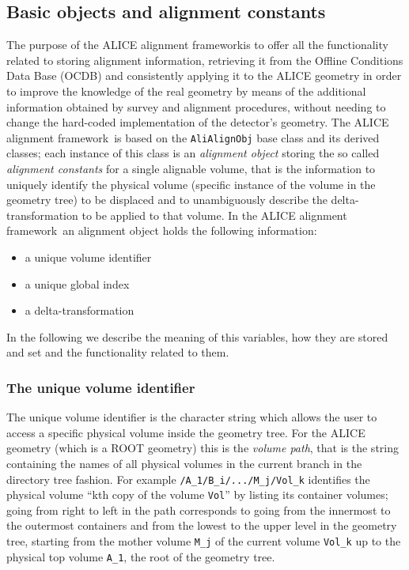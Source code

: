 \documentclass[12pt,a4paper,twoside]{article}
\makeatletter
\newcommand {\ROOT} {ROOT\@\xspace}
\newcommand{\FR}{ALICE alignment framework}
\makeatother
\begin{document}
{\subsection{Basic objects and alignment constants}
The purpose of the \FR is to offer all the
functionality related to storing alignment information, retrieving it from
the Offline Conditions Data Base (OCDB) and consistently applying it to the
ALICE geometry in order to improve the knowledge of the real geometry
by means of the additional information obtained by
survey and alignment procedures, without needing to change the
hard-coded implementation of the detector's geometry.
The \FR\ is based on the \lstinline{AliAlignObj}
base class and its derived classes; each instance of this class is an
\emph{alignment object} storing the so called \emph{alignment
constants} for a single alignable volume, that is the information to
uniquely identify the physical volume (specific instance of the volume
in the geometry tree) to be displaced and to unambiguously describe the
delta-transformation to be applied to that volume. 
In the \FR\ an alignment object holds the
following information:
\begin{itemize}
  \item a unique volume identifier
  \item a unique global index
  \item a delta-transformation
\end{itemize}
In the following we describe the meaning of this variables, how they
are stored and set and the functionality related to them.

\subsubsection{The unique volume identifier}
The unique volume identifier is the character string which allows the user to
access a specific physical volume inside the geometry tree. For the
ALICE geometry (which is a \ROOT geometry) this is the \emph{volume
path}, that is the string containing the names of all physical volumes
in the current branch in the directory tree fashion. For example
\lstinline!/A_1/B_i/.../M_j/Vol_k! identifies the physical volume ``kth
copy of the volume \lstinline!Vol!'' by listing its container volumes;
going from right to left in the path corresponds to going from the
innermost to the outermost containers and from the lowest to the upper
level in the geometry tree, starting from the mother volume
\lstinline!M_j! of the current volume \lstinline!Vol_k! up to the
physical top volume \lstinline!A_1!, the root of the geometry tree.

}
\end{document}

